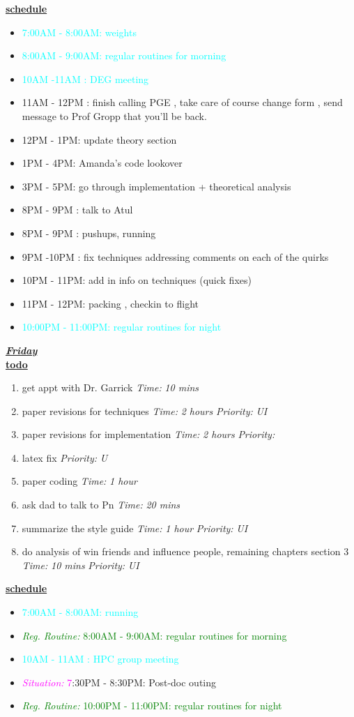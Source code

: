 \documentclass[11pt]{article}
\newcommand{\timeEst}[1]{\textit{Time:} \textit{#1}}
\newcommand{\priority}[1]{\textit{Priority:} \textit{#1}}
\newcommand{\regItem}[1]{\item \textcolor{cyan}{#1}}
\newcommand{\regRoutineItem}[1]{\item \textcolor{green}{\textit{Reg. Routine:} #1}}
\newcommand{\situationItem}[1]{\item \textcolor{magenta}{\textit{Situation:} #1}}
\begin{document}
\underline{\textbf{schedule}}\\
\begin{itemize}
\regItem{7:00AM - 8:00AM: weights}
\regItem{8:00AM - 9:00AM: regular routines for morning}
\regItem {10AM -11AM : DEG meeting}
\item 11AM - 12PM  : finish calling PGE , take care of course change form , send message to Prof Gropp that you'll be back.
\item 12PM - 1PM: update theory section
\item 1PM - 4PM: Amanda's code lookover
\item 3PM - 5PM: go through implementation + theoretical analysis
\item 8PM - 9PM : talk to Atul
\item 8PM - 9PM : pushups, running
\item 9PM -10PM :  fix techniques addressing comments on each of the quirks
\item 10PM - 11PM: add in info on techniques (quick fixes)
\item 11PM - 12PM: packing , checkin to flight
\regItem{10:00PM - 11:00PM: regular routines for night}
\end{itemize}

\underline{\textbf{\textit{Friday}}}\\
\underline{\textbf{todo}}\\
\begin{enumerate}
\item get appt with Dr. Garrick \timeEst{10 mins}
\item paper revisions for techniques \timeEst{2 hours}  \priority{UI}
\item paper revisions for implementation \timeEst{2 hours}  \priority{}
\item latex fix \priority{U}
\item paper coding \timeEst{1 hour}
\item ask dad to talk to Pn \timeEst{20 mins}
\item summarize the style guide \timeEst{1 hour} \priority{UI}
\item do analysis of win friends and influence people, remaining chapters section 3 \timeEst{10 mins}  \priority{UI}
\end{enumerate}

\underline{\textbf{schedule}}\\
\begin{itemize}
\regItem{7:00AM - 8:00AM: running}
\regRoutineItem {8:00AM - 9:00AM: regular routines for morning}
\regItem{10AM - 11AM : HPC group meeting}
\situationItem 7:30PM - 8:30PM: Post-doc outing
\regRoutineItem{10:00PM - 11:00PM: regular routines for night}
\end{itemize}
\end{document}

